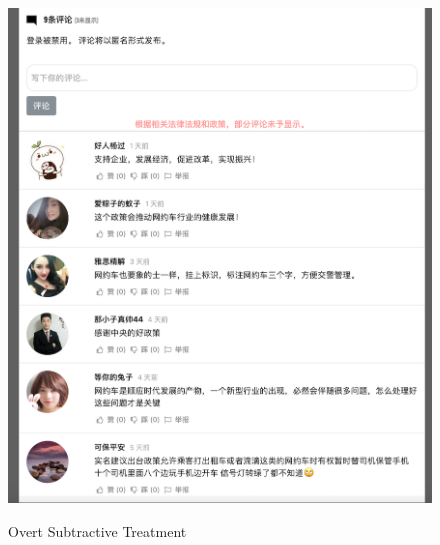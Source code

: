 \documentclass[11pt]{article}
\begin{document}
\begin{figure}
  \centering
  \caption{Overt Subtractive Treatment}
  \vspace{1em}
  \includegraphics[width=\textwidth]{figures/overt_subtractive.png}
  \label{OSP}
\end{figure}
\end{document}
